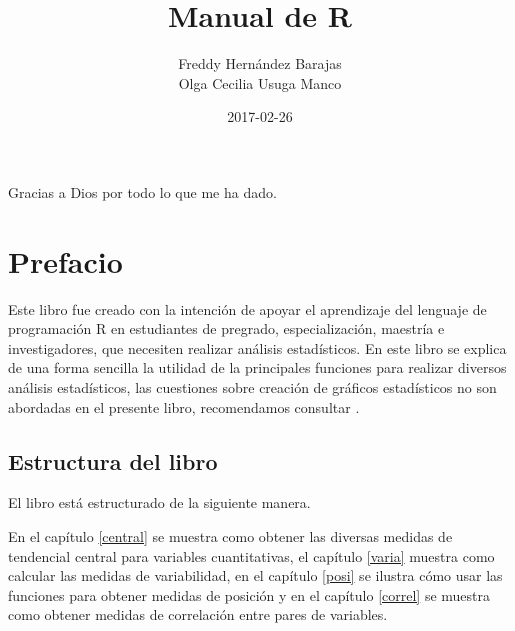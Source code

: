 \documentclass[10pt,]{krantz}
\title{Manual de R}
\author{Freddy Hernández Barajas\\
Olga Cecilia Usuga Manco}
\date{2017-02-26}
\let\proglang=\textsf
\begin{document}
\maketitle


\thispagestyle{empty}

\begin{center}

Gracias a Dios por todo lo que me ha dado.

\end{center}

\setlength{\abovedisplayskip}{-5pt}
\setlength{\abovedisplayshortskip}{-5pt}

{
\hypersetup{linkcolor=black}
\setcounter{tocdepth}{2}
\tableofcontents
}
\listoftables
\listoffigures
\chapter*{Prefacio}\label{prefacio}


Este libro fue creado con la intención de apoyar el aprendizaje del
lenguaje de programación \proglang{R} en estudiantes de pregrado,
especialización, maestría e investigadores, que necesiten realizar
análisis estadísticos. En este libro se explica de una forma sencilla la
utilidad de la principales funciones para realizar diversos análisis
estadísticos, las cuestiones sobre creación de gráficos estadísticos no
son abordadas en el presente libro, recomendamos consultar
\citet{correa_hernandez}.

\section*{Estructura del libro}\label{estructura-del-libro}


El libro está estructurado de la siguiente manera.

En el capítulo \ref{central} se muestra como obtener las diversas
medidas de tendencial central para variables cuantitativas, el capítulo
\ref{varia} muestra como calcular las medidas de variabilidad, en el
capítulo \ref{posi} se ilustra cómo usar las funciones para obtener
medidas de posición y en el capítulo \ref{correl} se muestra como
obtener medidas de correlación entre pares de variables.
\end{document}
